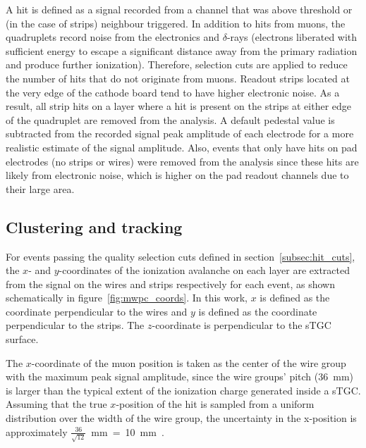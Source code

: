 A hit is defined as a signal recorded from a channel that was above threshold or (in the case of strips) neighbour triggered. In addition to hits from muons, the quadruplets record noise from the electronics and $\delta$-rays (electrons liberated with sufficient energy to escape a significant distance away from the primary radiation and produce further ionization). Therefore, selection cuts are applied to reduce the number of hits that do not originate from muons. Readout strips located at the very edge of the cathode board tend to have higher electronic noise.  As a result, all strip hits on a layer where a hit is present on the strips at either edge of the quadruplet are removed from the analysis. A default pedestal value is subtracted from the recorded signal peak amplitude of each electrode for a more realistic estimate of the signal amplitude. Also, events that only have hits on pad electrodes (no strips or wires) were removed from the analysis since these hits are likely from electronic noise, which is higher on the pad readout channels due to their large area.

\subsection{Clustering and tracking}
\label{subsec:clustering}
For events passing the quality selection cuts defined in section~\ref{subsec:hit_cuts}, the $x$- and $y$-coordinates of the ionization avalanche on each layer are extracted from the signal on the wires and strips respectively for each event, as shown schematically in figure~\ref{fig:mwpc_coords}. In this work, $x$ is defined as the coordinate perpendicular to the wires and $y$ is defined as the coordinate perpendicular to the strips. The $z$-coordinate is perpendicular to the sTGC surface.

The $x$-coordinate of the muon position is taken as the center of the wire group with the maximum peak signal amplitude, since the wire groups' pitch (\SI{36}{\milli\meter}) is larger than the typical extent of the ionization charge generated inside a sTGC. Assuming that the true $x$-position of the hit is sampled from a uniform distribution over the width of the wire group, the uncertainty in the x-position is approximately $\frac{36}{\sqrt{12}}$~mm~=~10~mm~\cite{Sauli:117989}.

